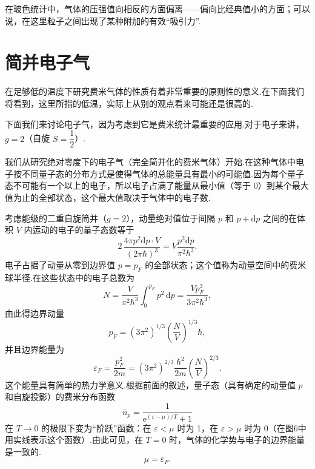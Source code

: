 在玻色统计中，气体的压强值向相反的方面偏离——偏向比经典值小的方面；可以说，在这里粒子之间出现了某种附加的有效“吸引力”.

\section{简并电子气}

在足够低的温度下研究费米气体的性质有着非常重要的原则性的意义.在下面我们将看到，这里所指的低温，实际上从别的观点看来可能还是很高的.

下面我们来讨论电子气，因为考虑到它是费米统计最重要的应用.对于电子来讲，$g=2$（自旋 $S=\dfrac{1}{2}$）.

我们从研究绝对零度下的电子气（完全简并化的费米气体）开始.在这种气体中电子按不同量子态的分布方式是使得气体的总能量具有最小的可能值.因为每个量子态不可能有一个以上的电子，所以电子占满了能量从最小值（等于 0）到某个最大值为止的全部状态，这个最大值取决于气体中的电子数.

考虑能级的二重自旋简并（$g=2$），动量绝对值位于间隔 $p$ 和 $p+\mathrm{d}p$ 之间的在体积 $V$ 内运动的电子的量子态数等于
\begin{equation}
  2\,\frac{4\pi p^2\mathrm{d}p\cdot V}{(2\pi\hbar)^3}
  =V\frac{p^2\mathrm{d}p}{\pi^2\hbar^3}.
\end{equation}
电子占据了动量从零到边界值 $p=p_F$ 的全部状态；这个值称为动量空间中的费米球半径.在这些状态中的电子总数为
\begin{equation*}
  N=\frac{V}{\pi^2\hbar^3}\int_0^{p_F}p^2\,\mathrm{d}p
  =\frac{Vp_F^3}{3\pi^2\hbar^3},
\end{equation*}
由此得边界动量
\begin{equation}
  p_F=(3\pi^2)^{1/3}\left(\frac{N}{V}\right)^{1/3}\hbar,
\end{equation}
并且边界能量为
\begin{equation}
  \varepsilon_F=\frac{p_F^2}{2m}=(3\pi^2)^{2/3}\frac{\hbar^2}{2m}
  \left(\frac{N}{V}\right)^{2/3}.
\end{equation}
这个能量具有简单的热力学意义.根据前面的叙述，量子态（具有确定的动量值 $p$ 和自旋投影）的费米分布函数
\begin{equation}
  \bar{n}_p=\frac{1}{\mathrm{e}^{(\varepsilon-\mu)/T}+1}
\end{equation}
在 $T\to0$ 的极限下变为“阶跃”函数：在 $\varepsilon<\mu$ 时为 1，在 $\varepsilon>\mu$ 时为 0（在图6中用实线表示这个函数）.由此可见，在 $T=0$ 时，气体的化学势与电子的边界能量是一致的.
\begin{equation}
  \mu=\varepsilon_F.
\end{equation}


